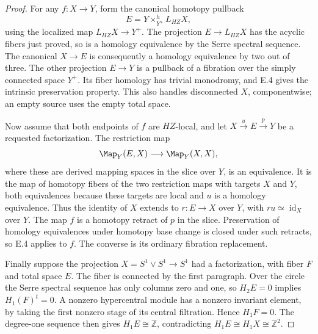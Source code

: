 \begin{proof}
For any $f:X\to Y$, form the canonical homotopy pullback
\[
                  E=Y\times^h_{Y^+}L_{HZ}X,
                                                               \tag{E.8.8}
\]
using the localized map $L_{HZ}X\to Y^+$. The projection
$E\to L_{HZ}X$ has the acyclic fibers just proved, so is a
homology equivalence by the Serre spectral sequence. The
canonical $X\to E$ is consequently a homology equivalence
by two out of three. The other projection $E\to Y$ is a
pullback of a fibration over the simply connected space $Y^+$.
Its fiber homology has trivial monodromy, and E.4 gives the
intrinsic preservation property. This also handles disconnected
$X$, componentwise; an empty source uses the empty total space.

Now assume that both endpoints of $f$ are $HZ$-local, and let
$X\xrightarrow{u}E\xrightarrow{p}Y$ be a requested factorization.
The restriction map
\[
              \Map_Y(E,X)\longrightarrow\Map_Y(X,X),
\]
where these are derived mapping spaces in the slice over $Y$,
is an equivalence. It is the map of homotopy fibers of the two
restriction maps with targets $X$ and $Y$, both equivalences
because these targets are local and $u$ is a homology equivalence.
Thus the identity of $X$ extends to $r:E\to X$ over $Y$, with
$ru\simeq\operatorname{id}_X$ over $Y$. The map $f$ is a
homotopy retract of $p$ in the slice. Preservation of homology
equivalences under homotopy base change is closed under such
retracts, so E.4 applies to $f$. The converse is its ordinary
fibration replacement.

Finally suppose the projection $X=S^1\vee S^1\to S^1$ had a
factorization, with fiber $F$ and total space $E$. The fiber is
connected by the first paragraph. Over the circle the Serre
spectral sequence has only columns zero and one, so
$H_2E=0$ implies $H_1(F)^{t}=0$. A nonzero hypercentral module
has a nonzero invariant element, by taking the first nonzero
stage of its central filtration. Hence $H_1F=0$. The degree-one
sequence then gives $H_1E\cong\mathbb Z$, contradicting
$H_1E\cong H_1X\cong\mathbb Z^2$.
\end{proof}

